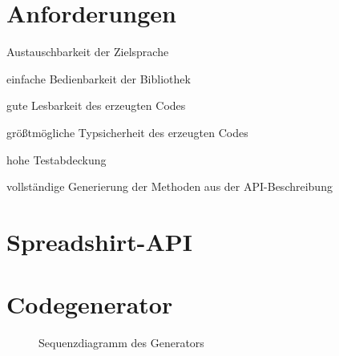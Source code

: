 \documentclass[a4paper, 12pt, DIV=12]{scrartcl}
\begin{document}
\section{Anforderungen}
    \begin{compactitem}
        \item Austauschbarkeit der Zielsprache
        \item einfache Bedienbarkeit der Bibliothek
        \item gute Lesbarkeit des erzeugten Codes
        \item größtmögliche Typsicherheit des erzeugten Codes
        \item {\color{gray} hohe Testabdeckung}
        \item vollständige Generierung der Methoden aus der API-Beschreibung
    \end{compactitem}

\section{Spreadshirt-API}

\section{Codegenerator}
\begin{figure}[h]
    \resizebox{\textwidth}{!}{
        
    }
    \caption{Sequenzdiagramm des Generators}
\end{figure}


\label{lastpage}
\end{document}
